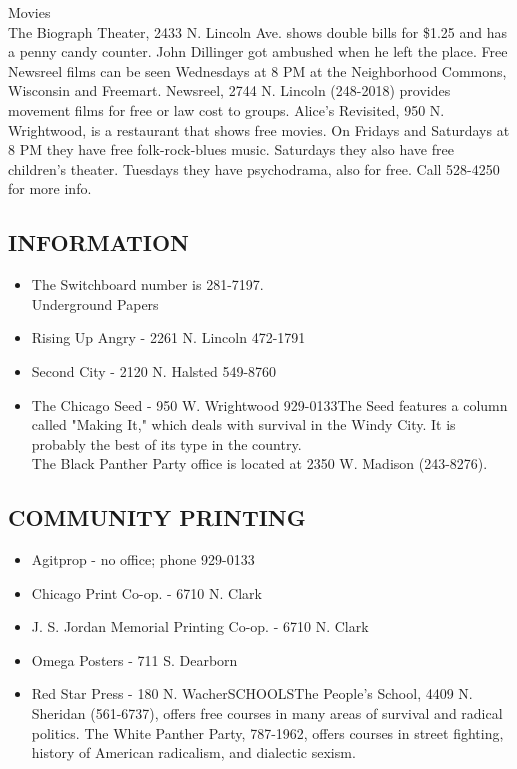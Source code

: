 \documentclass[11pt,twoside,a4paper]{book}
\begin{document}
Movies~\\
The Biograph Theater, 2433 N. Lincoln Ave. shows double bills for \$1.25 and has a penny candy counter. John Dillinger got ambushed when he left the place. 
Free Newsreel films can be seen Wednesdays at 8 PM at the Neighborhood Commons, Wisconsin and Freemart. Newsreel, 2744 N. Lincoln (248-2018) provides movement films for free or law cost to groups. 
Alice's Revisited, 950 N. Wrightwood, is a restaurant that shows free movies. On Fridays and Saturdays at 8 PM they have free folk-rock-blues music. Saturdays they also have free children's theater. Tuesdays they have psychodrama, also for free. Call 528-4250 for more info.~\\

\subsection{INFORMATION}
\begin{itemize}
\item The Switchboard number is 281-7197.~\\

Underground Papers 
\item Rising Up Angry - 2261 N. Lincoln 472-1791 
\item Second City  - 2120 N. Halsted 549-8760 
\item The Chicago Seed - 950 W. Wrightwood 929-0133The Seed features a column called "Making It," which deals with survival in the Windy City. It is probably the best of its type in the country.~\\

The Black Panther Party office is located at 2350 W. Madison (243-8276).
\end{itemize}

\subsection{COMMUNITY PRINTING}
\begin{itemize}
\item Agitprop - no office; phone 929-0133 
\item Chicago Print Co-op. - 6710 N. Clark 
\item J. S. Jordan Memorial Printing Co-op. - 6710 N. Clark 
\item Omega Posters - 711 S. Dearborn 
\item Red Star Press - 180 N. WacherSCHOOLSThe People's School, 4409 N. Sheridan (561-6737), offers free courses in many areas of survival and radical politics. The White Panther Party, 787-1962, offers courses in street fighting, history of American radicalism, and dialectic sexism.
\end{itemize}
\end{document}
